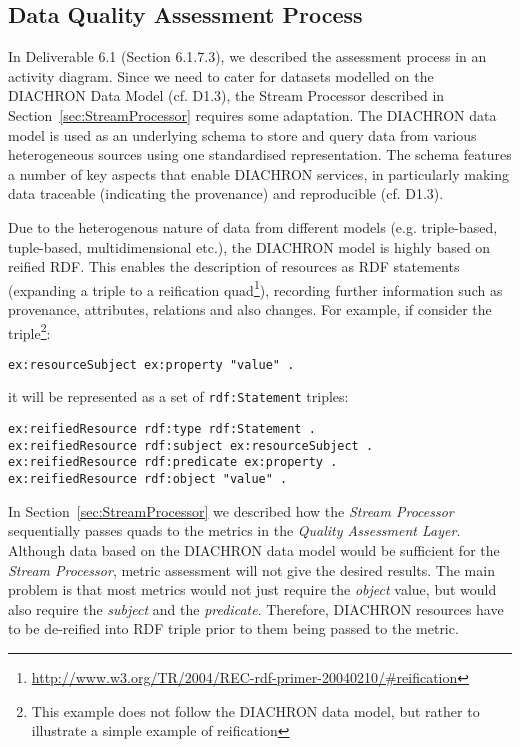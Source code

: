 
\subsection{Data Quality Assessment Process}
\label{sec:DQAssessment} 
In Deliverable 6.1 (Section 6.1.7.3), we described the assessment process in an activity diagram.
Since we need to cater for datasets modelled on the DIACHRON Data Model (cf. D1.3), the Stream Processor described in Section~\ref{sec:StreamProcessor} requires some adaptation.
The DIACHRON data model is used as an underlying schema to store and query data from various heterogeneous sources using one standardised representation.
The schema features a number of key aspects that enable DIACHRON services, in particularly making data traceable (indicating the provenance) and reproducible (cf. D1.3).

Due to the heterogenous nature of data from different models (e.g. triple-based, tuple-based, multidimensional etc.), the DIACHRON model is highly based on reified RDF.
This enables the description of resources as RDF statements (expanding a triple to a reification quad\footnote{\url{http://www.w3.org/TR/2004/REC-rdf-primer-20040210/#reification}}), recording further information such as provenance, attributes, relations and also changes.
For example, if consider the triple\footnote{This example does not follow the DIACHRON data model, but rather to illustrate a simple example of reification}:
\begin{lstlisting}[language=N3]
ex:resourceSubject ex:property "value" .
\end{lstlisting}
it will be represented as a set of \texttt{rdf:Statement} triples:
\begin{lstlisting}[language=N3]
ex:reifiedResource rdf:type rdf:Statement .
ex:reifiedResource rdf:subject ex:resourceSubject .
ex:reifiedResource rdf:predicate ex:property .
ex:reifiedResource rdf:object "value" .
\end{lstlisting}

In Section~\ref{sec:StreamProcessor} we described how the \emph{Stream Processor} sequentially passes quads to the metrics in the \emph{Quality Assessment Layer}.
Although data based on the DIACHRON data model would be sufficient for the \emph{Stream Processor}, metric assessment will not give the desired results.
The main problem is that most metrics would not just require the \emph{object} value, but would also require the \emph{subject} and the \emph{predicate}.
Therefore, DIACHRON resources have to be de-reified into RDF triple prior to them being passed to the metric.

